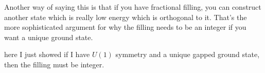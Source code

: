 Another  way of saying this is that if you have fractional filling,
you can construct another state which is really low energy which is orthogonal
to it.
That's the more sophisticated argument for why the filling needs to be an
integer if you want a unique ground state.

here I just showed if I have $U(1)$ symmetry and a unique gapped ground state,
then the filling must be integer.
